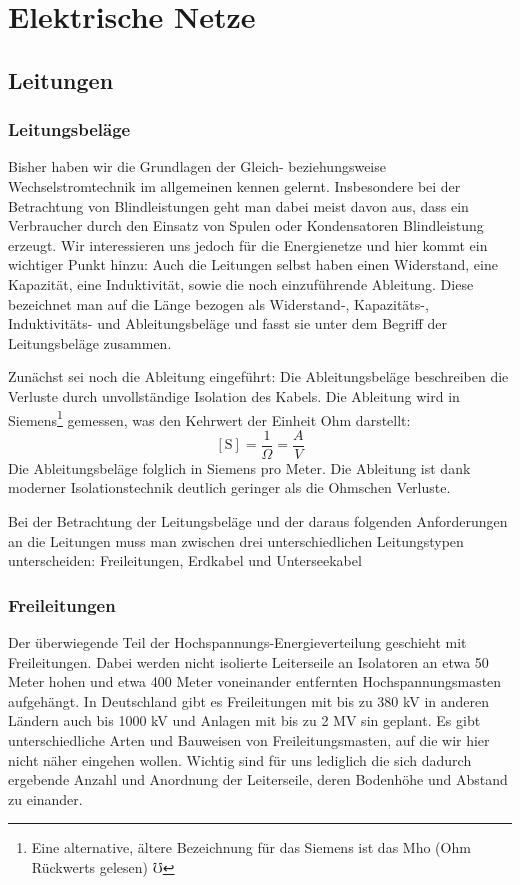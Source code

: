 \documentclass[10pt,a4paper]{article}
\begin{document}
\section{Elektrische Netze}
\subsection{Leitungen}

\subsubsection{Leitungsbeläge}
Bisher haben wir die Grundlagen der Gleich- beziehungsweise Wechselstromtechnik im allgemeinen kennen gelernt.
Insbesondere bei der Betrachtung von Blindleistungen geht man dabei meist davon aus,
dass ein Verbraucher durch den Einsatz von Spulen oder Kondensatoren Blindleistung erzeugt.
Wir interessieren uns jedoch für die Energienetze und hier kommt ein wichtiger Punkt hinzu:
Auch die Leitungen selbst haben einen Widerstand, eine Kapazität, eine Induktivität, sowie die noch einzuführende Ableitung.
Diese bezeichnet man auf die Länge bezogen als Widerstand-, Kapazitäts-, Induktivitäts- und Ableitungsbeläge und fasst sie unter dem Begriff der Leitungsbeläge zusammen.

Zunächst sei noch die Ableitung eingeführt: Die Ableitungsbeläge beschreiben die Verluste durch unvollständige Isolation des Kabels. Die Ableitung wird in Siemens\footnote{Eine alternative, ältere Bezeichnung für das Siemens ist das Mho (Ohm Rückwerts gelesen) $\mho$ } gemessen, was den Kehrwert der Einheit Ohm darstellt:
\begin{equation}
\mathrm{[S]} = \frac{1}{\Omega} = \frac{A}{V}
\end{equation}
Die Ableitungsbeläge folglich in Siemens pro Meter.
Die Ableitung ist dank moderner Isolationstechnik deutlich geringer als die Ohmschen Verluste.

Bei der Betrachtung der Leitungsbeläge und der daraus folgenden Anforderungen an die Leitungen muss man zwischen drei unterschiedlichen Leitungstypen unterscheiden: Freileitungen, Erdkabel und Unterseekabel %

\subsubsection{Freileitungen}
Der überwiegende Teil der Hochspannungs-Energieverteilung geschieht mit Freileitungen.
Dabei werden nicht isolierte Leiterseile an Isolatoren an etwa 50 Meter hohen und etwa 400 Meter voneinander entfernten Hochspannungsmasten aufgehängt. %
In Deutschland gibt es Freileitungen mit bis zu 380 kV in anderen Ländern auch bis 1000 kV und Anlagen mit bis zu 2 MV sin geplant\cite{Flosdorff}.
Es gibt unterschiedliche Arten und Bauweisen von Freileitungsmasten, auf die wir hier nicht näher eingehen wollen. Wichtig sind für uns lediglich die sich dadurch ergebende Anzahl und Anordnung der Leiterseile, deren Bodenhöhe und Abstand zu einander.
\end{document}
